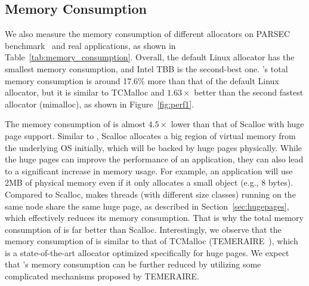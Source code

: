 \subsection{Memory Consumption}
\label{sec:memory}

We also measure the memory consumption of different allocators on PARSEC benchmark~\cite{parsec} and real applications, as shown in Table~\ref{tab:memory_consumption}.
Overall, the default Linux allocator has the smallest memory consumption, and Intel TBB is the second-best one. \NM{}'s total memory consumption is around 17.6\% more than that of the default Linux allocator, but it is similar to TCMalloc and $1.63\times$ better than the second fastest allocator (mimalloc), as shown in Figure~\ref{fig:perf1}. 

The memory consumption of \NM{} is almost $4.5\times$ lower than that of Scalloc with huge page support. Similar to \NM{}, Scalloc allocates a big region of virtual memory from the underlying OS initially, which will be backed by huge pages physically. While the huge pages can improve the performance of an application, they can also lead to a significant increase in memory usage. For example, an application will use 2MB of physical memory even if it only allocates a small object (e.g., 8 bytes). Compared to Scalloc, \NM{} makes threads (with different size classes) running on the same node share the same huge page, as described in Section~\ref{sec:hugepages}, which effectively reduces its memory consumption. That is why the total memory consumption of \NM{} is far better than Scalloc. Interestingly, we observe that the memory consumption of \NM{} is similar to that of TCMalloc (TEMERAIRE~\cite{TEMERAIRE}), which is a state-of-the-art allocator optimized specifically for huge pages. We expect that \NM{}'s memory consumption can be further reduced by utilizing some complicated mechanisms proposed by TEMERAIRE.  


